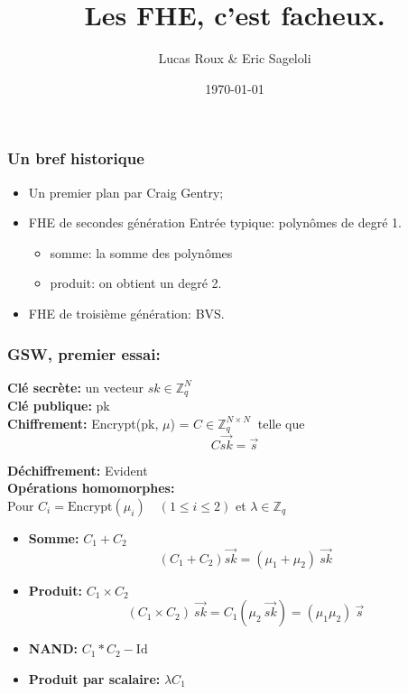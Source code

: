 \documentclass[11pt,xcolor={usenames,dvipsnames}]{beamer}
\title{Les FHE, c'est facheux.}
\date{\today}
\author{Lucas Roux \& Eric Sageloli}
\newcommand{\ZZq}{\mathbb{Z}_q}
\begin{document}
 \begin{frame} 
 \frametitle{Un bref historique}

\begin{itemize}
\item Un premier plan par Craig Gentry;
\item FHE de secondes génération
Entrée typique: polynômes de degré 1.
\begin{itemize}
\item somme: la somme des polynômes
\item produit: on obtient un degré 2.
\end{itemize}
\item FHE de troisième génération: BVS.
\end{itemize}
\end{frame} 


\begin{frame} 
\frametitle{GSW, premier essai:}
\textbf{Clé secrète:} un vecteur $sk \in \ZZq^{N}$ \\
\textbf{Clé publique:} pk\\
\textbf{Chiffrement:} Encrypt(pk, $\mu$) = $C\in \ZZq^{N \times N}\:$ telle que  
\[C \vec{sk} = \vec{s}\]
\vspace{-1cm}

\textbf{Déchiffrement:} Evident \\
\textbf{Opérations homomorphes:}\\
Pour {\small$C_i = \text{Encrypt}(\mu_i) \quad(1 \leqslant i \leqslant 2)$}
et $\lambda \in \ZZq$
\begin{itemize}
\item \textbf{Somme:} $C_1 + C_2\quad$
\[\left(C_1 + C_2\right) \vec{sk} = (\mu_1 + \mu_2)\: \vec{sk}\]
\item \textbf{Produit:} $C_1 \times C_2\quad$
\[\left(C_1 \times C_2\right)\: \vec{sk} = C_1\left(\mu_2\:\vec{sk}\right) = (\mu_1 \mu_2)\:\vec{s}\]
\item \textbf{NAND:} $C_1 * C_2 - \text{Id}$
\item \textbf{Produit par scalaire:} $\lambda C_1\quad$
\end{itemize}
\end{frame} 

\end{document}
